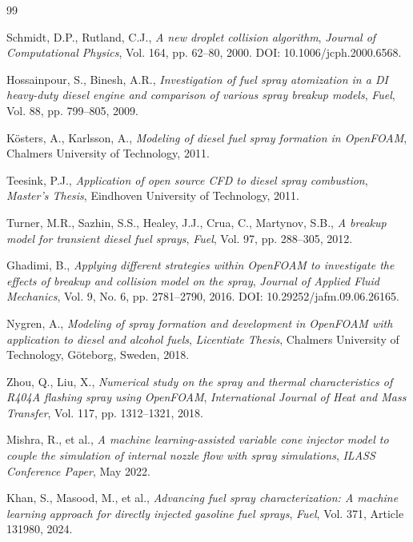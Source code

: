 \documentclass[letterpaper,twocolumn,10pt]{article}
\begin{document}
\begin{thebibliography}{99}

Schmidt, D.P., Rutland, C.J., \textit{A new droplet collision algorithm},
{\it Journal of Computational Physics}, Vol. 164, pp. 62--80, 2000.
DOI: 10.1006/jcph.2000.6568.

Hossainpour, S., Binesh, A.R., \textit{Investigation of fuel spray atomization
in a DI heavy-duty diesel engine and comparison of various spray breakup models},
{\it Fuel}, Vol. 88, pp. 799--805, 2009.

K\"osters, A., Karlsson, A., \textit{Modeling of diesel fuel spray formation in
OpenFOAM}, Chalmers University of Technology, 2011.

Teesink, P.J., \textit{Application of open source CFD to diesel spray combustion},
{\it Master's Thesis}, Eindhoven University of Technology, 2011.

Turner, M.R., Sazhin, S.S., Healey, J.J., Crua, C., Martynov, S.B., \textit{A
breakup model for transient diesel fuel sprays}, {\it Fuel},
Vol. 97, pp. 288--305, 2012.

Ghadimi, B., \textit{Applying different strategies within OpenFOAM to investigate
the effects of breakup and collision model on the spray},
{\it Journal of Applied Fluid Mechanics}, Vol. 9, No. 6, pp. 2781--2790, 2016.
DOI: 10.29252/jafm.09.06.26165.

Nygren, A., \textit{Modeling of spray formation and development in OpenFOAM with
application to diesel and alcohol fuels}, {\it Licentiate Thesis},
Chalmers University of Technology, G\"oteborg, Sweden, 2018.

Zhou, Q., Liu, X., \textit{Numerical study on the spray and thermal
characteristics of R404A flashing spray using OpenFOAM},
{\it International Journal of Heat and Mass Transfer}, Vol. 117, pp. 1312--1321, 2018.

Mishra, R., et al., \textit{A machine learning-assisted variable cone injector
model to couple the simulation of internal nozzle flow with spray simulations},
{\it ILASS Conference Paper}, May 2022.

Khan, S., Masood, M., et al., \textit{Advancing fuel spray characterization:
A machine learning approach for directly injected gasoline fuel sprays},
{\it Fuel}, Vol. 371, Article 131980, 2024.


\end{thebibliography}
\end{document}
